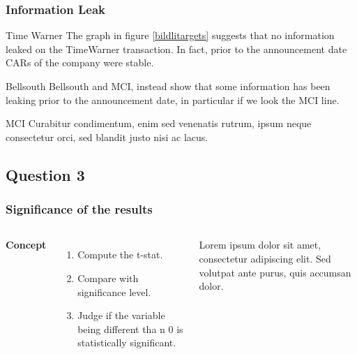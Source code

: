 \documentclass{beamer}
\begin{document}


\begin{frame}
	\frametitle{Information Leak}
	\begin{block}{Time Warner}
	The graph in figure \ref{bildlitargets} suggests that no information leaked on the TimeWarner transaction. In fact, prior to the announcement date CARs of the company were stable. \cite{p1}
	\end{block}
	
	\begin{block}{Bellsouth}
		Bellsouth and MCI, instead
		show that some information has been leaking prior to the announcement date, in particular if
		we look the MCI line.\cite{p1}
	\end{block}
	
	\begin{block}{MCI}
		 Curabitur condimentum, enim sed venenatis rutrum, ipsum neque consectetur orci, sed blandit justo nisi ac lacus. \cite{p1}
	\end{block}
\end{frame}

\subsection{Question 3}
\begin{frame}
	\frametitle{Significance of the results}
	\begin{columns}[c] %
		
		\textbf{Concept}
		\begin{enumerate}
			\item Compute the t-stat.
			\item Compare with significance level.
			\item Judge if the variable being different tha n 0 is statistically significant.\cite{p1}
		\end{enumerate}
		
		Lorem ipsum dolor sit amet, consectetur adipiscing elit. Sed volutpat ante purus, quis accumsan dolor.
		
	\end{columns}
\end{frame}

\end{document}
